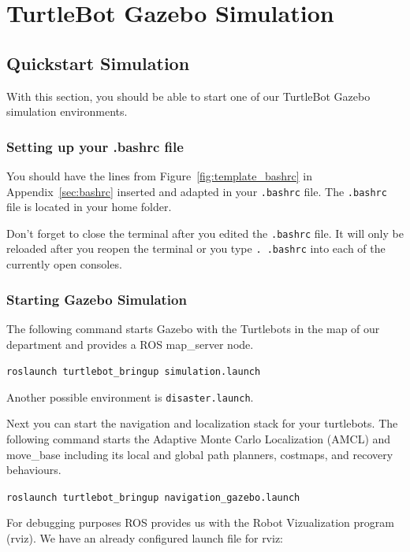 \chapter{TurtleBot Gazebo Simulation}
\label{chap:TurtleBotGazeboSimulation}

\section{Quickstart Simulation}
\label{sec:QuickstartSimulation}

With this section, you should be able to start one of our TurtleBot Gazebo simulation environments. 

\subsection{Setting up your .bashrc file}
\label{ssec:bashrc}

You should have the lines from Figure~\ref{fig:template_bashrc} in Appendix~\ref{sec:bashrc} inserted and adapted in your \verb$.bashrc$ file. The \verb$.bashrc$ file is located in your home folder. 

Don't forget to close the terminal after you edited the \verb$.bashrc$ file. It will only be reloaded after you reopen the terminal or you type \verb$. .bashrc$ into each of the currently open consoles.

\subsection{Starting Gazebo Simulation}
\label{ssec:StartSimulation}

The following command starts Gazebo with the Turtlebots in the map of our department and provides a ROS map\_server node.

\verb$roslaunch turtlebot_bringup simulation.launch$

Another possible environment is \verb$disaster.launch$.

Next you can start the navigation and localization stack for your turtlebots. The following command starts the Adaptive Monte Carlo Localization (AMCL) and move\_base including its local and global path planners, costmaps, and recovery behaviours.

\verb$roslaunch turtlebot_bringup navigation_gazebo.launch$

For debugging purposes ROS provides us with the Robot Vizualization program (rviz). We have an already configured launch file for rviz:

